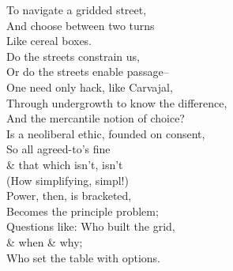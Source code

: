 To navigate a gridded street, \\
And choose between two turns \\
Like cereal boxes. \\
Do the streets constrain us, \\
Or do the streets enable passage-- \\
One need only hack, like Carvajal, \\
Through undergrowth to know the difference, \\
And the mercantile notion of choice? \\
Is a neoliberal ethic, founded on consent, \\
So all agreed-to's fine \\
\& that which isn't, isn't \\
(How simplifying, simpl!) \\
Power, then, is bracketed, \\
Becomes the principle problem; \\
Questions like: Who built the grid, \\
\& when \& why; \\
Who set the table with options.